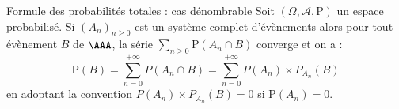 \documentclass[french,11pt,twoside]{VcCours}
\renewcommand{\P}{\text{P}}
\begin{document}
\begin{Theoreme}{Formule des probabilités totales : cas dénombrable}
Soit $(\Omega, \mathcal{A}, \P)$ un espace probabilisé. Si $(A_n)_{n \geq 0}$ est un système complet d'évènements alors pour tout évènement $B$ de $\AAA$, la série 
$ \sum_{n \geq 0} \P(A_n \cap B)$
converge et on a :
$$ \P(B) = \sum_{n=0}^{+ \infty} P(A_n \cap B) = \sum_{n=0}^{+ \infty} P(A_n) \times P_{A_n}( B)$$
en adoptant la convention $P(A_n) \times P_{A_n}( B)=0$ si $\P(A_n)=0$.
\end{Theoreme}
%

\begin{Demonstration}{}

\vspace{6cm}
\end{Demonstration}
\end{document}
